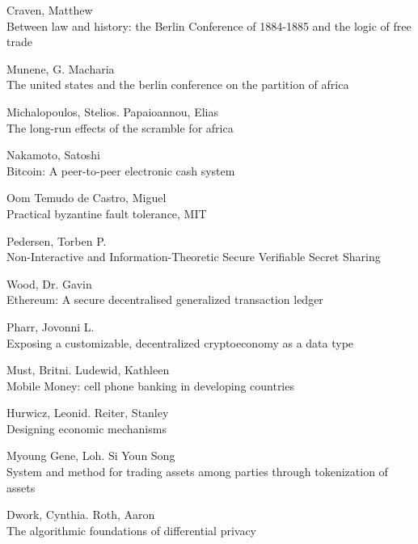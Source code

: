 \documentclass[10pt, titlepage, twocolumn]{report}
\begin{document}
\begin{thebibliography}{9}

Craven, Matthew \\
Between law and history: the Berlin Conference of 1884-1885 and the logic of free trade

Munene, G. Macharia \\
The united states and the berlin conference on the partition of africa 
 
Michalopoulos, Stelios. Papaioannou, Elias \\
The long-run effects of the scramble for africa

Nakamoto, Satoshi \\
Bitcoin: A peer-to-peer electronic cash system

Oom Temudo de Castro, Miguel\\
Practical byzantine fault tolerance, MIT

Pedersen, Torben P.\\
Non-Interactive and Information-Theoretic Secure Verifiable Secret Sharing 


Wood, Dr. Gavin \\
Ethereum: A secure decentralised generalized transaction ledger

Pharr, Jovonni L. \\
Exposing a customizable, decentralized cryptoeconomy as a data type

Must, Britni. Ludewid, Kathleen \\
Mobile Money: cell phone banking in developing countries

Hurwicz, Leonid. Reiter, Stanley \\
Designing economic mechanisms

Myoung Gene, Loh. Si Youn Song \\
System and method for trading assets among parties through tokenization of assets

Dwork, Cynthia. Roth, Aaron \\
The algorithmic foundations of differential privacy

\end{thebibliography}
\end{document}
